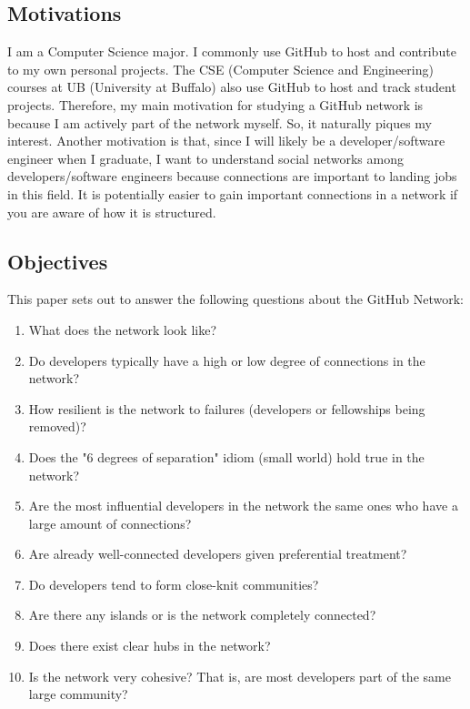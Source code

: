 \documentclass[9pt,twocolumn,twoside]{pnas-new}
\begin{document}
\subsection{Motivations} I am a Computer Science major. I commonly use GitHub to host and contribute to my own personal projects. The CSE (Computer Science and Engineering) courses at UB (University at Buffalo) also use GitHub to host and track student projects. Therefore, my main motivation for studying a GitHub network is because I am actively part of the network myself.  So, it naturally piques my interest. Another motivation is that, since I will likely be a developer/software engineer when I graduate, I want to understand social networks among developers/software engineers because connections are important to landing jobs in this field. It is potentially easier to gain important connections in a network if you are aware of how it is structured.

\subsection{Objectives} This paper sets out to answer the following questions about the GitHub Network:

\begin{enumerate}
  \item What does the network look like?
  \item Do developers typically have a high or low degree of connections in the network?
  \item How resilient is the network to failures (developers or fellowships being removed)?
  \item Does the "6 degrees of separation" idiom (small world) hold true in the network?
  \item Are the most influential developers in the network the same ones who have a large amount of connections?
  \item Are already well-connected developers given preferential treatment?
  \item Do developers tend to form close-knit communities?
  \item Are there any islands or is the network completely connected?
  \item Does there exist clear hubs in the network?
  \item Is the network very cohesive? That is, are most developers part of the same large community?
\end{enumerate}
\end{document}
